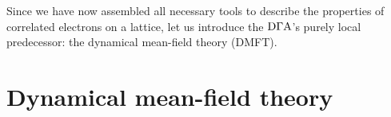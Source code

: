 \documentclass[\main/main.tex]{subfiles}
\begin{document}
\\\\
Since we have now assembled all necessary tools to describe the properties of correlated electrons on a lattice, let us introduce the $\text{D}\Gamma\text{A}$'s purely local predecessor: the dynamical mean-field theory (DMFT).

\section{Dynamical mean-field theory}\label{sec:dmft}
\end{document}
